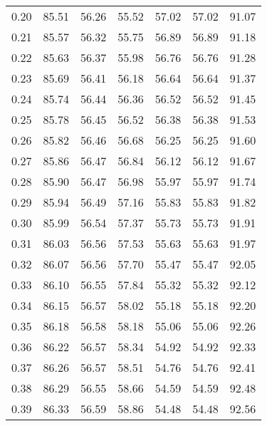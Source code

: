 \begin{tabular}{|c|c|c|c|c|c|c|}
      0.20 &     85.51 &     56.26 &      55.52 &   57.02 &      57.02 &         91.07 \\
      0.21 &     85.57 &     56.32 &      55.75 &   56.89 &      56.89 &         91.18 \\
      0.22 &     85.63 &     56.37 &      55.98 &   56.76 &      56.76 &         91.28 \\
      0.23 &     85.69 &     56.41 &      56.18 &   56.64 &      56.64 &         91.37 \\
      0.24 &     85.74 &     56.44 &      56.36 &   56.52 &      56.52 &         91.45 \\
      0.25 &     85.78 &     56.45 &      56.52 &   56.38 &      56.38 &         91.53 \\
      0.26 &     85.82 &     56.46 &      56.68 &   56.25 &      56.25 &         91.60 \\
      0.27 &     85.86 &     56.47 &      56.84 &   56.12 &      56.12 &         91.67 \\
      0.28 &     85.90 &     56.47 &      56.98 &   55.97 &      55.97 &         91.74 \\
      0.29 &     85.94 &     56.49 &      57.16 &   55.83 &      55.83 &         91.82 \\
      0.30 &     85.99 &     56.54 &      57.37 &   55.73 &      55.73 &         91.91 \\
      0.31 &     86.03 &     56.56 &      57.53 &   55.63 &      55.63 &         91.97 \\
      0.32 &     86.07 &     56.56 &      57.70 &   55.47 &      55.47 &         92.05 \\
      0.33 &     86.10 &     56.55 &      57.84 &   55.32 &      55.32 &         92.12 \\
      0.34 &     86.15 &     56.57 &      58.02 &   55.18 &      55.18 &         92.20 \\
      0.35 &     86.18 &     56.58 &      58.18 &   55.06 &      55.06 &         92.26 \\
      0.36 &     86.22 &     56.57 &      58.34 &   54.92 &      54.92 &         92.33 \\
      0.37 &     86.26 &     56.57 &      58.51 &   54.76 &      54.76 &         92.41 \\
      0.38 &     86.29 &     56.55 &      58.66 &   54.59 &      54.59 &         92.48 \\
      0.39 &     86.33 &     56.59 &      58.86 &   54.48 &      54.48 &         92.56 \\

\end{tabular}
